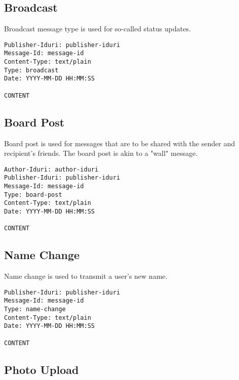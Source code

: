 \documentclass[letterpaper,11pt,oneside]{article}
\begin{document}
\subsection{Broadcast}

Broadcast message type is used for so-called status updates.

\vspace{10pt}
\begin{verbatim}
Publisher-Iduri: publisher-iduri
Message-Id: message-id
Content-Type: text/plain
Type: broadcast
Date: YYYY-MM-DD HH:MM:SS

CONTENT
\end{verbatim}
\vspace{10pt}

\subsection{Board Post}

Board post is used for messages that are to be shared with the sender and
recipient's friends. The board post is akin to a "wall" message.

\vspace{10pt}
\begin{verbatim}
Author-Iduri: author-iduri
Publisher-Iduri: publisher-iduri
Message-Id: message-id
Type: board-post
Content-Type: text/plain
Date: YYYY-MM-DD HH:MM:SS

CONTENT
\end{verbatim}
\vspace{10pt}

\subsection{Name Change}

Name change is used to transmit a user's new name.

\vspace{10pt}
\begin{verbatim}
Publisher-Iduri: publisher-iduri
Message-Id: message-id
Type: name-change
Content-Type: text/plain
Date: YYYY-MM-DD HH:MM:SS

CONTENT
\end{verbatim}
\vspace{10pt}

\subsection{Photo Upload}
\end{document}
